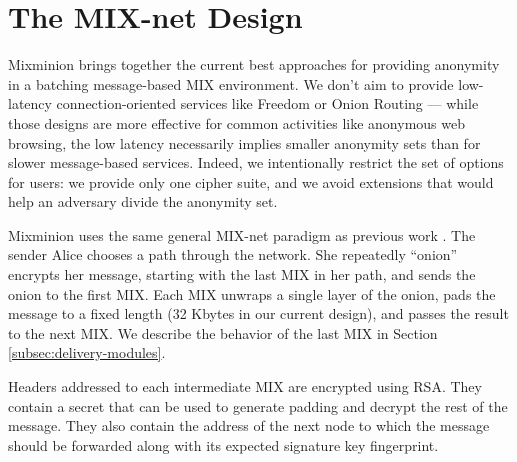 \documentclass[11pt]{IEEEtran}
\begin{document}
\section{The MIX-net Design}
\label{sec:design}

Mixminion brings together the current best approaches for providing
anonymity in a batching message-based MIX environment. We don't aim
to provide low-latency connection-oriented services like Freedom
\cite{freedom} or Onion Routing \cite{goldschlag99} --- while those
designs are more effective for common activities like anonymous web
browsing, the low latency necessarily implies smaller anonymity sets
than for slower message-based services. Indeed, we intentionally
restrict the set of options for users: we provide only one
cipher suite, and we avoid extensions that would help an adversary
divide the anonymity set.

Mixminion uses the same general MIX-net paradigm as previous work
\cite{chaum-mix,mixmaster-attacks,babel}. The sender Alice chooses a
path through the network. She repeatedly ``onion'' encrypts her message,
starting with the last
MIX in her path, and sends the onion to the first MIX. Each
MIX unwraps a single layer of the onion, pads the message to a fixed
length (32 Kbytes in our current design), and passes the result to the
next MIX. We describe the behavior of the last MIX in
Section \ref{subsec:delivery-modules}.


Headers addressed to each intermediate MIX are encrypted using RSA.
They contain a secret 
that can be used to generate padding and decrypt the rest
of the message. They also contain the address of the next node to 
which the message should be forwarded along with its expected signature 
key fingerprint.


\end{document}
